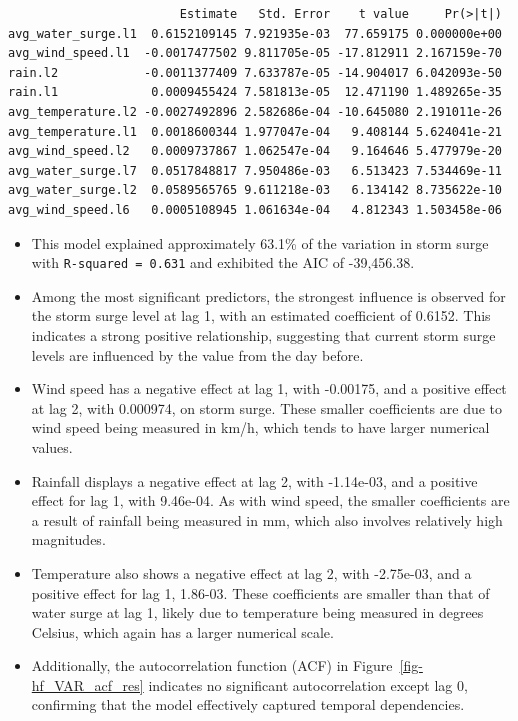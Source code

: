 \documentclass[
  letterpaper,
  DIV=11,
  numbers=noendperiod]{scrartcl}
\begin{document}
\begin{verbatim}
                        Estimate   Std. Error    t value     Pr(>|t|)
avg_water_surge.l1  0.6152109145 7.921935e-03  77.659175 0.000000e+00
avg_wind_speed.l1  -0.0017477502 9.811705e-05 -17.812911 2.167159e-70
rain.l2            -0.0011377409 7.633787e-05 -14.904017 6.042093e-50
rain.l1             0.0009455424 7.581813e-05  12.471190 1.489265e-35
avg_temperature.l2 -0.0027492896 2.582686e-04 -10.645080 2.191011e-26
avg_temperature.l1  0.0018600344 1.977047e-04   9.408144 5.624041e-21
avg_wind_speed.l2   0.0009737867 1.062547e-04   9.164646 5.477979e-20
avg_water_surge.l7  0.0517848817 7.950486e-03   6.513423 7.534469e-11
avg_water_surge.l2  0.0589565765 9.611218e-03   6.134142 8.735622e-10
avg_wind_speed.l6   0.0005108945 1.061634e-04   4.812343 1.503458e-06
\end{verbatim}

\begin{itemize}
\item
  This model explained approximately 63.1\% of the variation in storm
  surge with \texttt{R-squared\ =\ 0.631} and exhibited the AIC of
  -39,456.38.
\item
  Among the most significant predictors, the strongest influence is
  observed for the storm surge level at lag 1, with an estimated
  coefficient of 0.6152. This indicates a strong positive relationship,
  suggesting that current storm surge levels are influenced by the value
  from the day before.
\item
  Wind speed has a negative effect at lag 1, with -0.00175, and a
  positive effect at lag 2, with 0.000974, on storm surge. These smaller
  coefficients are due to wind speed being measured in km/h, which tends
  to have larger numerical values.
\item
  Rainfall displays a negative effect at lag 2, with -1.14e-03, and a
  positive effect for lag 1, with 9.46e-04. As with wind speed, the
  smaller coefficients are a result of rainfall being measured in mm,
  which also involves relatively high magnitudes.
\item
  Temperature also shows a negative effect at lag 2, with -2.75e-03, and
  a positive effect for lag 1, 1.86-03. These coefficients are smaller
  than that of water surge at lag 1, likely due to temperature being
  measured in degrees Celsius, which again has a larger numerical scale.
\item
  Additionally, the autocorrelation function (ACF) in
  Figure~\ref{fig-hf_VAR_acf_res} indicates no significant
  autocorrelation except lag 0, confirming that the model effectively
  captured temporal dependencies.
\end{itemize}
\end{document}
